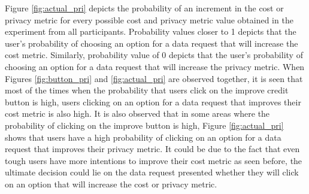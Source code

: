 Figure \ref{fig:actual_pri} depicts the probability of an increment in the cost or privacy metric for every possible cost and privacy metric value obtained in the experiment from all participants. Probability values closer to 1 depicts that the user's probability of choosing an option for a data request that will increase the cost metric. Similarly, probability value of 0 depicts that the user's probability of choosing an option for a data request that will increase the privacy metric. When Figures \ref{fig:button_pri} and \ref{fig:actual_pri} are observed together, it is seen that most of the times when the probability that users click on the improve credit button is high, users clicking on an option for a data request that improves their cost metric is also high. It is also observed that in some areas where the probability of clicking on the improve button is high, Figure \ref{fig:actual_pri} shows that users have a high probability of clicking on an option for a data request that improves their privacy metric. It could be due to the fact that even tough users have more intentions to improve their cost metric as seen before, the ultimate decision could lie on the data request presented whether they will click on an option that will increase the cost or privacy metric.

%
%


